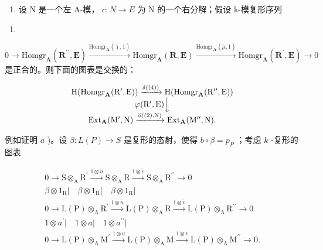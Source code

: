\begin{enumerate}
\def\labelenumi{\alph{enumi})}
\setcounter{enumi}{1}
\tightlist
\item
  设 N 是一个左 A-模， \(c : N \to E\) 为 N 的一个右分解；假设 k-模复形序列
\end{enumerate}

\begin{enumerate}
\def\labelenumi{(\arabic{enumi})}
\setcounter{enumi}{3}
\tightlist
\item
\end{enumerate}

\(0 \to \text{Homgr}_{\mathbf{A}}(\mathbf{R}^{\prime \prime}, \mathbf{E}) \xrightarrow{\text{Homgr}_{\mathbf{A}}(\tilde{\imath}, 1)} \text{Homgr}_{\mathbf{A}}(\mathbf{R}, \mathbf{E}) \xrightarrow{\text{Homgr}_{\mathbf{A}}(\tilde{\mu}, 1)} \text{Homgr}_{\mathbf{A}}(\mathbf{R}^{\prime}, \mathbf{E}) \to 0\) 是正合的。则下面的图表是交换的：

\[
\begin{array}{c} \mathrm{H} (\operatorname{Homgr} _ {\mathbf {A}} (\mathrm{R} ^ {\prime}, \mathrm{E})) \xrightarrow {\delta ((4))} \mathrm{H} (\operatorname{Homgr} _ {\mathbf {A}} (\mathrm{R} ^ {\prime \prime}, \mathrm{E})) \\ \varphi (\mathrm{R} ^ {\prime}, \mathrm{E}) \Big \downarrow \\ \operatorname{Ext} _ {\mathbf {A}} (\mathrm{M} ^ {\prime}, \mathrm{N}) \xrightarrow {\partial ((2) , \mathrm{N})} \operatorname{Ext} _ {\mathbf {A}} (\mathrm{M} ^ {\prime \prime}, \mathrm{N}). \end{array}
\]

例如证明 \(a\) )。设 \(\beta: L(P) \to S\) 是复形的态射，使得 \(b \circ \beta = p_{P}\) ；考虑 \(k\) -复形的图表

\[
\begin{array}{c}0 \rightarrow \mathrm{S} \otimes_ {\mathrm{A}} \mathrm{R} ^ {\prime} \xrightarrow {1 \otimes \tilde {u}} \mathrm{S} \otimes_ {\mathrm{A}} \mathrm{R} \xrightarrow {1 \otimes \tilde {v}} \mathrm{S} \otimes_ {\mathrm{A}} \mathrm{R} ^ {\prime \prime} \longrightarrow 0\\\beta \otimes 1 _ {\mathrm{R}} \Bigg | \quad \beta \otimes 1 _ {\mathrm{R}} \Bigg | \quad \beta \otimes 1 _ {\mathrm{R}} \Bigg |\\0 \rightarrow \mathrm{L(P)} \otimes_ {\mathrm{A}} \mathrm{R} ^ {\prime} \xrightarrow {1 \otimes \tilde {u}} \mathrm{L(P)} \otimes_ {\mathrm{A}} \mathrm{R} \xrightarrow {1 \otimes \tilde {v}} \mathrm{L(P)} \otimes_ {\mathrm{A}} \mathrm{R} ^ {\prime \prime} \longrightarrow 0\\1 \otimes a ^ {\prime} \Bigg | \quad 1 \otimes a \Bigg | \quad 1 \otimes a ^ {\prime \prime} \Bigg |\\0 \rightarrow \mathrm{L(P)} \otimes_ {\mathrm{A}} \mathrm{M} ^ {\prime} \xrightarrow {1 \otimes u} \mathrm{L(P)} \otimes_ {\mathrm{A}} \mathrm{M} \xrightarrow {1 \otimes v} \mathrm{L(P)} \otimes_ {\mathrm{A}} \mathrm{M} ^ {\prime \prime} \longrightarrow 0.\end{array}
\]

